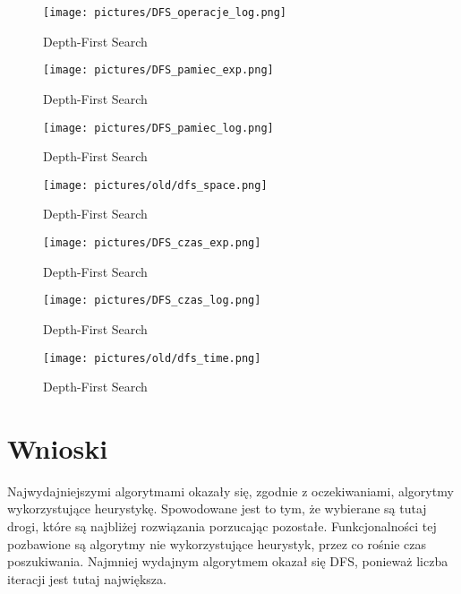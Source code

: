 \documentclass{classrep}
\begin{document}
\clearpage

\begin{figure}[ht]
\centering
			\texttt{[image: pictures/DFS\_operacje\_log.png]}
	\caption{Depth-First Search}
	\label{fig:Depth-First Search}
\end{figure}

\begin{figure}[ht]
\centering
			\texttt{[image: pictures/DFS\_pamiec\_exp.png]}
	\caption{Depth-First Search}
	\label{fig:Depth-First Search}
\end{figure}

\begin{figure}[ht]
\centering
			\texttt{[image: pictures/DFS\_pamiec\_log.png]}
	\caption{Depth-First Search}
	\label{fig:Depth-First Search}
\end{figure}

\begin{figure}[ht]
\centering
			\texttt{[image: pictures/old/dfs\_space.png]}
	\caption{Depth-First Search}
	\label{fig:Depth-First Search}
\end{figure}

\begin{figure}[ht]
\centering
			\texttt{[image: pictures/DFS\_czas\_exp.png]}
	\caption{Depth-First Search}
	\label{fig:Depth-First Search}
\end{figure}

\begin{figure}[ht]
\centering
			\texttt{[image: pictures/DFS\_czas\_log.png]}
	\caption{Depth-First Search}
	\label{fig:Depth-First Search}
\end{figure}

\begin{figure}[ht]
\centering
			\texttt{[image: pictures/old/dfs\_time.png]}
	\caption{Depth-First Search}
	\label{fig:Depth-First Search}
\end{figure}


\clearpage

\section{Wnioski}
  Najwydajniejszymi algorytmami okazały się, zgodnie z oczekiwaniami, algorytmy wykorzystujące heurystykę. Spowodowane jest to tym, że wybierane są tutaj drogi, które są najbliżej rozwiązania porzucając pozostałe. Funkcjonalności tej pozbawione są algorytmy nie wykorzystujące heurystyk, przez co rośnie czas poszukiwania. Najmniej wydajnym algorytmem okazał się DFS, ponieważ liczba iteracji jest tutaj największa.
\end{document}
